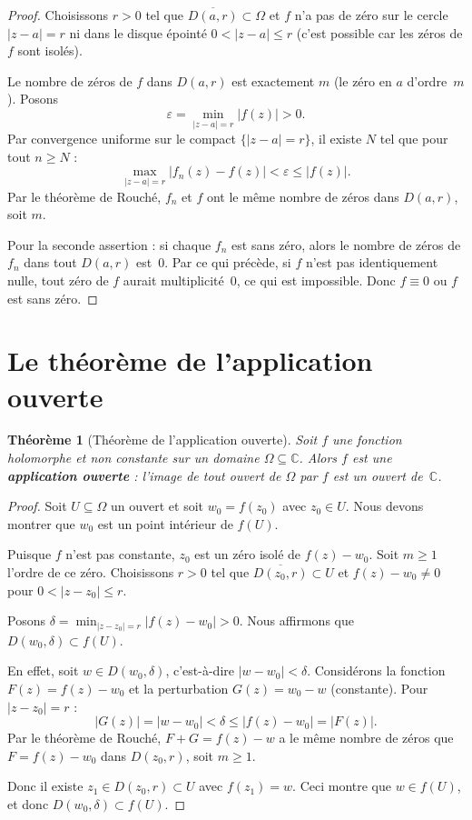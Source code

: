 \documentclass[12pt,a4paper,openany]{book}
\theoremstyle{definition}
\theoremstyle{plain}
\newtheorem{theoreme}[definition]{Théorème}
\theoremstyle{remark}
\newcommand{\C}{\mathbb{C}}
\newcommand{\abs}[1]{\left|#1\right|}
\begin{document}
\begin{proof}
Choisissons $r > 0$ tel que $\overline{D(a,r)} \subset \Omega$ et $f$ n'a pas
de zéro sur le cercle $\abs{z-a} = r$ ni dans le disque épointé
$0 < \abs{z-a} \leq r$ (c'est possible car les zéros de $f$ sont isolés).

Le nombre de zéros de $f$ dans $D(a,r)$ est exactement $m$ (le zéro en $a$
d'ordre~$m$). Posons
\[
  \varepsilon = \min_{\abs{z-a}=r} \abs{f(z)} > 0.
\]
Par convergence uniforme sur le compact $\{\abs{z-a} = r\}$, il existe $N$
tel que pour tout $n \geq N$ :
\[
  \max_{\abs{z-a}=r} \abs{f_n(z) - f(z)} < \varepsilon \leq \abs{f(z)}.
\]
Par le théorème de Rouché, $f_n$ et $f$ ont le même nombre de zéros dans
$D(a,r)$, soit $m$.

Pour la seconde assertion : si chaque $f_n$ est sans zéro, alors le nombre
de zéros de $f_n$ dans tout $D(a,r)$ est~$0$. Par ce qui précède, si $f$
n'est pas identiquement nulle, tout zéro de $f$ aurait multiplicité~$0$,
ce qui est impossible. Donc $f \equiv 0$ ou $f$ est sans zéro.
\end{proof}

\section{Le théorème de l'application ouverte}\label{sec:application-ouverte}

\begin{theoreme}[Théorème de l'application ouverte]\label{thm:application-ouverte}
Soit $f$ une fonction holomorphe et non constante sur un domaine
$\Omega \subseteq \C$. Alors $f$ est une \textbf{application ouverte} :
l'image de tout ouvert de $\Omega$ par $f$ est un ouvert de~$\C$.
\end{theoreme}

\begin{proof}
Soit $U \subseteq \Omega$ un ouvert et soit $w_0 = f(z_0)$ avec $z_0 \in U$.
Nous devons montrer que $w_0$ est un point intérieur de $f(U)$.

Puisque $f$ n'est pas constante, $z_0$ est un zéro isolé de $f(z) - w_0$.
Soit $m \geq 1$ l'ordre de ce zéro. Choisissons $r > 0$ tel que
$\overline{D(z_0, r)} \subset U$ et $f(z) - w_0 \neq 0$ pour
$0 < \abs{z - z_0} \leq r$.

Posons $\delta = \min_{\abs{z - z_0} = r} \abs{f(z) - w_0} > 0$.
Nous affirmons que $D(w_0, \delta) \subset f(U)$.

En effet, soit $w \in D(w_0, \delta)$, c'est-à-dire $\abs{w - w_0} < \delta$.
Considérons la fonction $F(z) = f(z) - w_0$ et la perturbation
$G(z) = w_0 - w$ (constante). Pour $\abs{z - z_0} = r$ :
\[
  \abs{G(z)} = \abs{w - w_0} < \delta \leq \abs{f(z) - w_0} = \abs{F(z)}.
\]
Par le théorème de Rouché, $F + G = f(z) - w$ a le même nombre de zéros que
$F = f(z) - w_0$ dans $D(z_0, r)$, soit $m \geq 1$.

Donc il existe $z_1 \in D(z_0, r) \subset U$ avec $f(z_1) = w$.
Ceci montre que $w \in f(U)$, et donc $D(w_0, \delta) \subset f(U)$.
\end{proof}
\end{document}
